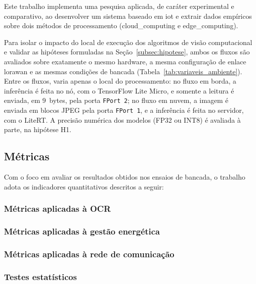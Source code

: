 Este trabalho implementa uma pesquisa aplicada, de caráter experimental e
comparativo, ao desenvolver um sistema baseado em \gls{iot} e extrair dados
empíricos sobre dois métodos de processamento (\gls{cloud_computing} e
\gls{edge_computing}).

Para isolar o impacto do local de execução dos algoritmos de visão
computacional e validar as hipóteses formuladas na Seção~\ref{subsec:hipotese},
ambos os fluxos são avaliados sobre exatamente o mesmo hardware, a mesma
configuração de enlace \gls{lorawan} e as mesmas condições de bancada
(Tabela~\ref{tab:variaveis_ambiente}). Entre os fluxos, varia apenas o local do
processamento: no fluxo em borda, a inferência é feita no nó, com o TensorFlow
Lite Micro, e somente a leitura é enviada, em 9~bytes, pela porta
\texttt{FPort~2}; no fluxo em nuvem, a imagem é enviada em blocos JPEG pela
porta \texttt{FPort~1}, e a inferência é feita no servidor, com o LiteRT. A
precisão numérica dos modelos (FP32 ou INT8) é avaliada à parte, na hipótese H1.

\subsection{Métricas}
\label{subsec:metricas}

Com o foco em avaliar os resultados obtidos nos ensaios de bancada, o trabalho
adota os indicadores quantitativos descritos a seguir:

\subsubsection{Métricas aplicadas à OCR}
\label{subsubsec:metricas_ocr}


\subsubsection{Métricas aplicadas à gestão energética}
\label{subsubsec:metricas_energia}


\subsubsection{Métricas aplicadas à rede de comunicação}
\label{subsubsec:metricas_rede}


\subsubsection{Testes estatísticos}
\label{subsubsec:testes_estatisticos}


